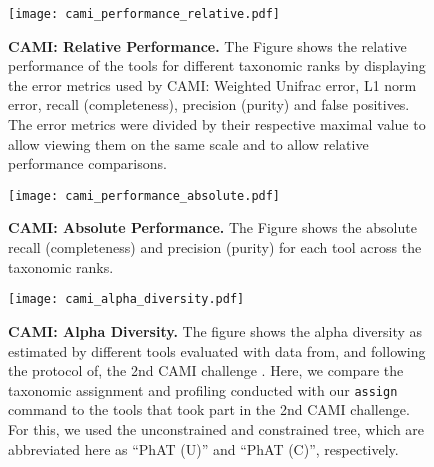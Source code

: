 
\begin{figure}[hpbt]
    \centering
    \texttt{[image: cami\_performance\_relative.pdf]}
    \vspace{1em}
    \caption[CAMI: Relative Performance]{
        \textbf{CAMI: Relative Performance.}
        The Figure shows the relative performance of the tools
        for different taxonomic ranks by displaying the error metrics used by CAMI:
        Weighted Unifrac error, L1 norm error, recall (completeness), precision (purity) and false positives.
        The error metrics were divided by their respective maximal value to allow viewing them on the same scale
        and to allow relative performance comparisons.
    }
    \label{fig:cami_performance_relative}
\end{figure}


\begin{figure}[hpbt]
    \centering
    \texttt{[image: cami\_performance\_absolute.pdf]}
    \vspace{1em}
    \caption[CAMI: Absolute Performance]{
        \textbf{CAMI: Absolute Performance.}
        The Figure shows the absolute recall (completeness) and precision (purity)
        for each tool across the taxonomic ranks.
    }
    \label{fig:cami_performance_absolute}
\end{figure}


\begin{figure}[hpbt]
    \centering
    \texttt{[image: cami\_alpha\_diversity.pdf]}
    \begin{subfigure}{0pt}
        \label{fig:cami_alpha_diversity:sub:total}
    \end{subfigure}
    \begin{subfigure}{0pt}
        \label{fig:cami_alpha_diversity:sub:difference}
    \end{subfigure}
    \caption[CAMI: Alpha Diversity]{
        \textbf{CAMI: Alpha Diversity.}
        The figure shows the alpha diversity as estimated by different tools evaluated
        with data from, and following the protocol of, the 2nd CAMI challenge \citep{Sczyrba2017,Bremges2018}.
        Here, we compare the taxonomic assignment and profiling conducted with our \texttt{assign} command
        to the tools that took part in the 2nd CAMI challenge.
        For this, we used the unconstrained and constrained  tree,
        which are abbreviated here as ``PhAT (U)'' and ``PhAT (C)'', respectively.
    }
    \label{fig:cami_alpha_diversity}
\end{figure}


